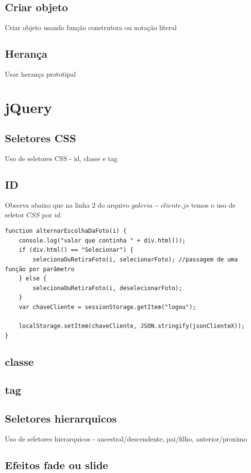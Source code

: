 \subsection{Criar objeto}
Criar objeto usando função construtora ou notação literal


\subsection{Herança}
Usar herança prototipal


\section{jQuery}
\subsection{Seletores CSS}
Uso de seletores CSS - id, classe e tag
\subsection{ID}
	Observa abaixo que na linha 2 do arquivo $galeria-cliente.js$ temos o uso de seletor $CSS$ por $id$.
	
\begin{lstlisting}
function alternarEscolhaDaFoto(i) {
    console.log("valor que continha " + div.html());
    if (div.html() == "Selecionar") {
        selecionaOuRetiraFoto(i, selecionarFoto); //passagem de uma função por parâmetro
    } else {
        selecionaOuRetiraFoto(i, deselecionarFoto);
    }
    var chaveCliente = sessionStorage.getItem("logou");

    localStorage.setItem(chaveCliente, JSON.stringify(jsonClienteX));
}
\end{lstlisting}
\subsection{classe}


\subsection{tag}



\subsection{Seletores hierarquicos}
Uso de seletores hierarquicos - ancestral/descendente, pai/filho, anterior/proximo
\subsection{Efeitos fade ou slide}

